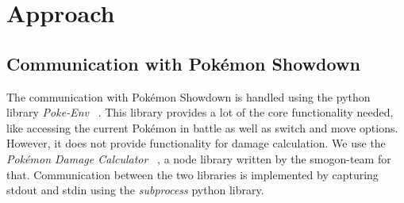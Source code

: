 
\chapter{Approach}
\label{ch:approach}
\section{Communication with Pokémon Showdown}
\label{sec:poke-env}
The communication with Pokémon Showdown is handled using the python library \textit{Poke-Env} ~\autocite{PokeEnv:Github}.
This library provides a lot of the core functionality needed, like accessing the current Pokémon in battle as well
as switch and move options. However, it does not provide functionality for damage calculation. We use the \textit{Pokémon
Damage Calculator} ~\autocite{Smogon:DamageCalc}, a node library written by the smogon-team for that. 
Communication between the two libraries is implemented by capturing stdout and stdin using the \textit{subprocess} python library.

